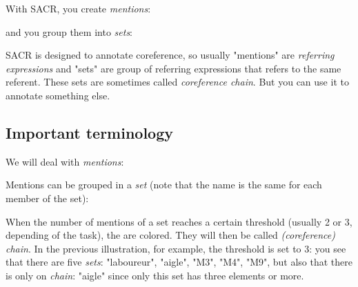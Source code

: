 \documentclass[12pt]{article}
\begin{document}
With SACR, you create \emph{mentions}:


and you group them into \emph{sets}:


SACR is designed to annotate coreference, so usually "mentions" are
\emph{referring expressions} and "sets" are group of referring expressions
that refers to the same referent.  These sets are sometimes called
\emph{coreference chain}.  But you can use it to annotate something else.

 \subsection{Important terminology}

\label{sec:terminology}

We will deal with \emph{mentions}:


Mentions can be grouped in a \emph{set} (note that the name is the same for
each member of the set):


When the number of mentions of a set reaches a certain threshold (usually 2
or 3, depending of the task), the are colored.  They will then be called
\emph{(coreference) chain}.  In the previous illustration, for example, the
threshold is set to 3: you see that there are five \emph{sets}: "laboureur",
"aigle", "M3", "M4", "M9", but also that there is only on \emph{chain}:
"aigle" since only this set has three elements or more.
\end{document}
